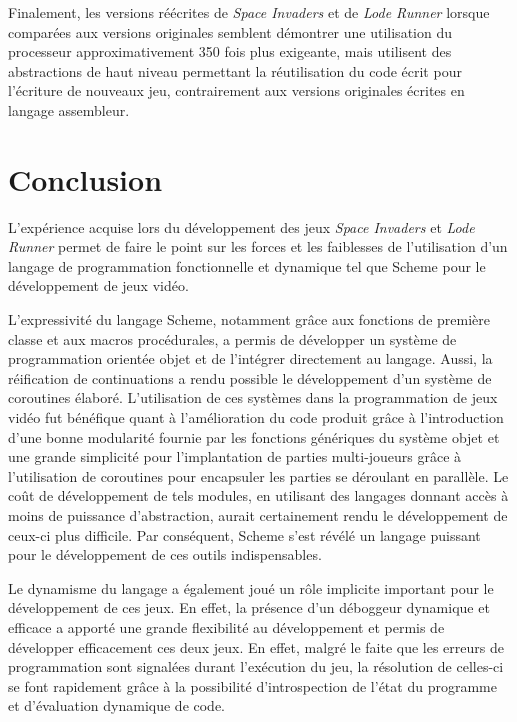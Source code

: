 \documentclass[12pt,twoside,letterpaper,francais]{book}
\begin{document}
Finalement, les versions réécrites de \textit{Space Invaders} et de
\textit{Lode Runner} lorsque comparées aux versions originales
semblent démontrer une utilisation du processeur approximativement 350
fois plus exigeante, mais utilisent des abstractions de haut niveau
permettant la réutilisation du code écrit pour l'écriture de nouveaux
jeu, contrairement aux versions originales écrites en langage
assembleur. 

\clearpage

\chapter{Conclusion}
L'expérience acquise lors du dévelop\-pement des jeux \textit{Space
  Invaders} et \textit{Lode Runner} permet de faire le point sur les
forces et les faiblesses de l'utilisation d'un langage de
programmation fonctionnelle et dynamique tel que Scheme pour le
dévelop\-pement de jeux vidéo.

L'expressivité du langage Scheme, notamment grâce aux fonctions de
première classe et aux macros procédurales, a permis de développer un
système de programmation orientée objet et de l'intégrer directement
au langage. Aussi, la réification de continuations a rendu possible le
dévelop\-pement d'un système de coroutines élaboré.  L'utilisation de
ces systèmes dans la programmation de jeux vidéo fut bénéfique quant à
l'amélioration du code produit grâce à l'introduction d'une bonne
modularité fournie par les fonctions génériques du système objet et
une grande simplicité pour l'implantation de parties multi-joueurs
grâce à l'utilisation de coroutines pour encapsuler les parties se
déroulant en parallèle. Le coût de dévelop\-pement de tels modules, en
utilisant des langages donnant accès à moins de puissance
d'abstraction, aurait certainement rendu le dévelop\-pement de ceux-ci
plus difficile. Par conséquent, Scheme s'est révélé un langage
puissant pour le dévelop\-pement de ces outils indispensables.

Le dynamisme du langage a également joué un rôle implicite important
pour le dévelop\-pement de ces jeux. En effet, la présence d'un
déboggeur dynamique et efficace a apporté une grande flexibilité au
dévelop\-pement et permis de développer efficacement ces deux jeux. En
effet, malgré le faite que les erreurs de programmation sont signalées
durant l'exécution du jeu, la résolution de celles-ci se font
rapidement grâce à la possibilité d'introspection de l'état du
programme et d'évaluation dynamique de code.
\end{document}
